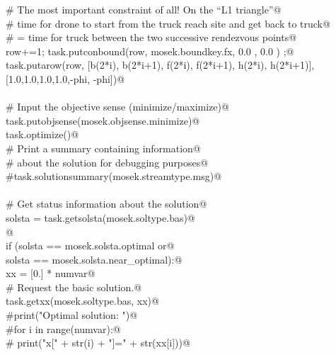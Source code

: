 \documentclass[11.5pt]{report}
\begin{document}
\begin{flushleft}
\begin{list}{}{}
\mbox{}\verb@                # The most important constraint of all! On the ``L1 triangle''@\\
\mbox{}\verb@                # time for drone to start from the truck reach site and get back to truck@\\
\mbox{}\verb@                # = time for truck between the two successive rendezvous points@\\
\mbox{}\verb@                row+=1; task.putconbound(row, mosek.boundkey.fx, 0.0 , 0.0 ) ;@\\
\mbox{}\verb@                task.putarow(row, [b(2*i), b(2*i+1), f(2*i), f(2*i+1), h(2*i), h(2*i+1)], [1.0,1.0,1.0,1.0,-phi, -phi])@\\
\mbox{}\verb@@\\
\mbox{}\verb@            # Input the objective sense (minimize/maximize)@\\
\mbox{}\verb@            task.putobjsense(mosek.objsense.minimize)@\\
\mbox{}\verb@            task.optimize()@\\
\mbox{}\verb@            # Print a summary containing information@\\
\mbox{}\verb@            # about the solution for debugging purposes@\\
\mbox{}\verb@            #task.solutionsummary(mosek.streamtype.msg)@\\
\mbox{}\verb@@\\
\mbox{}\verb@            # Get status information about the solution@\\
\mbox{}\verb@            solsta = task.getsolsta(mosek.soltype.bas)@\\
\mbox{}\verb@            @\\
\mbox{}\verb@            if (solsta == mosek.solsta.optimal or@\\
\mbox{}\verb@                        solsta == mosek.solsta.near_optimal):@\\
\mbox{}\verb@                    xx = [0.] * numvar@\\
\mbox{}\verb@                        # Request the basic solution.@\\
\mbox{}\verb@                    task.getxx(mosek.soltype.bas, xx)@\\
\mbox{}\verb@                    #print("Optimal solution: ")@\\
\mbox{}\verb@                    #for i in range(numvar):@\\
\mbox{}\verb@                    #    print("x[" + str(i) + "]=" + str(xx[i]))@\\

\end{list}
\end{flushleft}
\end{document}
